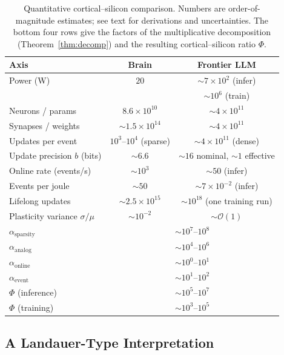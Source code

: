 \documentclass[11pt]{article}
\theoremstyle{definition}
\theoremstyle{remark}
\begin{document}
\begin{table}[t]
  \centering
  \caption{Quantitative cortical--silicon comparison.  Numbers are
  order-of-magnitude estimates; see text for derivations and
  uncertainties.  The bottom four rows give the factors of the
  multiplicative decomposition (Theorem~\ref{thm:decomp}) and the
  resulting cortical--silicon ratio $\Phi$.}
  \label{tab:comparison}
  \small
  \begin{tabular}{lcc}
    \toprule
    Axis & Brain & Frontier LLM \\
    \midrule
    Power (W) & $20$ & $\sim 7\times 10^{2}$ (infer) \\
              &      & $\sim 10^{6}$ (train) \\
    Neurons / params & $8.6\times 10^{10}$ & $\sim 4\times 10^{11}$ \\
    Synapses / weights & $\sim 1.5\times 10^{14}$ & $\sim 4\times 10^{11}$ \\
    Updates per event & $10^{3}$--$10^{4}$ (sparse) & $\sim 4\times 10^{11}$ (dense) \\
    Update precision $b$ (bits) & $\sim 6.6$ & $\sim 16$ nominal, $\sim 1$ effective \\
    Online rate (events/s) & $\sim 10^{3}$ & $\sim 50$ (infer) \\
    Events per joule & $\sim 50$ & $\sim 7\times 10^{-2}$ (infer) \\
    Lifelong updates & $\sim 2.5\times 10^{15}$ & $\sim 10^{18}$ (one training run) \\
    Plasticity variance $\sigma/\mu$ & $\sim 10^{-2}$ & $\sim \mathcal{O}(1)$ \\
    \midrule
    $\alpha_{\mathrm{sparsity}}$ & \multicolumn{2}{c}{$\sim 10^{7}$--$10^{8}$} \\
    $\alpha_{\mathrm{analog}}$ & \multicolumn{2}{c}{$\sim 10^{4}$--$10^{6}$} \\
    $\alpha_{\mathrm{online}}$ & \multicolumn{2}{c}{$\sim 10^{0}$--$10^{1}$} \\
    $\alpha_{\mathrm{event}}$ & \multicolumn{2}{c}{$\sim 10^{1}$--$10^{2}$} \\
    $\Phi$ (inference) & \multicolumn{2}{c}{$\sim 10^{5}$--$10^{7}$} \\
    $\Phi$ (training) & \multicolumn{2}{c}{$\sim 10^{3}$--$10^{5}$} \\
    \bottomrule
  \end{tabular}
\end{table}

\subsection{A Landauer-Type Interpretation}
\label{sec:landauer}
\end{document}
